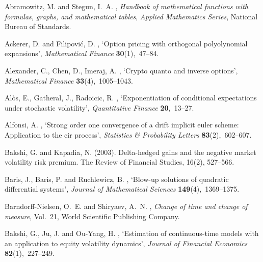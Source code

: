 \documentclass[11pt,a4paper] {article}
\begin{document}
\begin{thebibliography}{}

Abramowitz, M. and Stegun, I.~A.  \harvardyearright , {\em Handbook of mathematical functions with
  formulas, graphs, and mathematical tables}, {\em Applied
  Mathematics Series}, National Bureau of Standards.

Ackerer, D. and Filipovi{\'c}, D.  \harvardyearright , `Option pricing with orthogonal polyolynomial
  expansions', {\em Mathematical Finance} {\bf 30}(1),~47--84.

Alexander, C., Chen, D., Imeraj, A. \harvardyearright , `Crypto quanto and inverse options', {\em Mathematical Finance} {\bf 33}(4),~1005--1043.

Al\`os, E., Gatheral, J., Radoicic, R. \harvardyearright , `Exponentiation of conditional expectations under
stochastic volatility', {\em Quantitative Finance} {\bf 20},~13--27.
	
	
Alfonsi, A.  \harvardyearright , `Strong order one
  convergence of a drift implicit euler scheme: Application to the cir
  process', {\em Statistics \& Probability Letters} {\bf 83}(2),~602--607.

Bakshi, G. and Kapadia, N. (2003). Delta-hedged gains and the negative market volatility risk premium. The Review of Financial Studies, 16(2), 527--566.


Baris, J., Baris, P. and Ruchlewicz, B.  \harvardyearright , `Blow-up solutions of quadratic differential
  systems', {\em Journal of Mathematical Sciences} {\bf 149}(4),~1369--1375.

 Barndorff-Nielsen, O.~E. and Shiryaev, A.~N.  \harvardyearright , {\em Change of time and change of measure}, Vol.~21,
  World Scientific Publishing Company.

Bakshi, G., Ju, J. and Ou-Yang, H.  \harvardyearright , `Estimation of continuous-time models with an application to equity volatility dynamics', {\em Journal of Financial Economics} {\bf 82}(1),~227--249.


\end{thebibliography}
\end{document}
